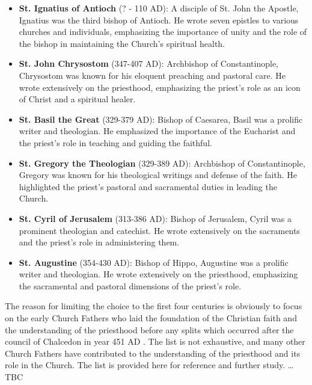 \documentclass[12pt, doc]{apa7}   	%
\begin{document}
\begin{itemize}
    \item \textbf{St. Ignatius of Antioch} (? - 110 AD): A disciple of St. John the Apostle, Ignatius was the third bishop of Antioch. He wrote seven epistles to various churches and individuals, emphasizing the importance of unity and the role of the bishop in maintaining the Church’s spiritual health.
    \item \textbf{St. John Chrysostom} (347-407 AD): Archbishop of Constantinople, Chrysostom was known for his eloquent preaching and pastoral care. He wrote extensively on the priesthood, emphasizing the priest’s role as an icon of Christ and a spiritual healer.
    \item \textbf{St. Basil the Great} (329-379 AD): Bishop of Caesarea, Basil was a prolific writer and theologian. He emphasized the importance of the Eucharist and the priest’s role in teaching and guiding the faithful.
    \item \textbf{St. Gregory the Theologian} (329-389 AD): Archbishop of Constantinople, Gregory was known for his theological writings and defense of the faith. He highlighted the priest’s pastoral and sacramental duties in leading the Church.
    \item \textbf{St. Cyril of Jerusalem} (313-386 AD): Bishop of Jerusalem, Cyril was a prominent theologian and catechist. He wrote extensively on the sacraments and the priest’s role in administering them.
    \item \textbf{St. Augustine} (354-430 AD): Bishop of Hippo, Augustine was a prolific writer and theologian. He wrote extensively on the priesthood, emphasizing the sacramental and pastoral dimensions of the priest’s role.
\end{itemize}
    

The reason for limiting the choice to the first four centuries is obviously to focus on the early Church Fathers who laid the foundation of the Christian faith and the understanding of the priesthood before any splits which occurred after the  council of Chalcedon in year 451 AD \citep{early_church_akin}.  The list is not exhaustive, and many other Church Fathers have contributed to the understanding of the priesthood and its role in the Church.  The list is provided here for reference and further study. \dots TBC
\end{document}
